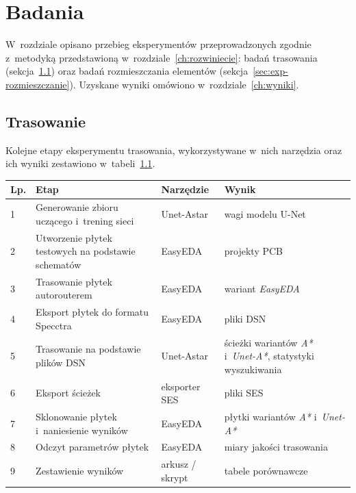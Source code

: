 \chapter{Badania}
\label{ch:badania}

W~rozdziale opisano przebieg eksperymentów przeprowadzonych zgodnie
z~metodyką przedstawioną w~rozdziale~\ref{ch:rozwiniecie}: badań
trasowania (sekcja~\ref{sec:exp-trasowanie}) oraz badań rozmieszczania
elementów (sekcja~\ref{sec:exp-rozmieszczanie}). Uzyskane wyniki
omówiono w~rozdziale~\ref{ch:wyniki}.

\section{Trasowanie}
\label{sec:exp-trasowanie}

Kolejne etapy eksperymentu trasowania, wykorzystywane w~nich narzędzia
oraz ich wyniki zestawiono w~tabeli~\ref{tab:etapy}.

\begin{table}[ht]
\label{tab:etapy}
\centering\footnotesize%
\begin{tabular}{p{} p{} p{} p{}}
\toprule
Lp. & Etap & Narzędzie & Wynik \\
\midrule
1 & Generowanie zbioru uczącego i~trening sieci & Unet-Astar & wagi modelu U-Net \\
\midrule
2 & Utworzenie płytek testowych na podstawie schematów & EasyEDA & projekty PCB \\
\midrule
3 & Trasowanie płytek autorouterem & EasyEDA & wariant \emph{EasyEDA} \\
\midrule
4 & Eksport płytek do formatu Specctra & EasyEDA & pliki DSN \\
\midrule
5 & Trasowanie na podstawie plików DSN & Unet-Astar & ścieżki wariantów
  \emph{A*} i~\emph{Unet-A*}, statystyki wyszukiwania \\
  \midrule
6 & Eksport ścieżek & eksporter SES & pliki SES \\
\midrule
7 & Sklonowanie płytek i~naniesienie wyników & EasyEDA & płytki wariantów
  \emph{A*} i~\emph{Unet-A*} \\
  \midrule
8 & Odczyt parametrów płytek & EasyEDA & miary jakości trasowania \\
\midrule
9 & Zestawienie wyników & arkusz / skrypt & tabele porównawcze \\
\bottomrule
\end{tabular}
\end{table}

